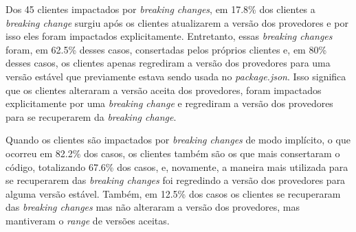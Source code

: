 Dos 45 clientes impactados por \textit{breaking changes}, em 17.8\% dos clientes a \textit{breaking change} surgiu após os clientes atualizarem a versão dos provedores e por isso eles foram impactados explicitamente. Entretanto, essas \textit{breaking changes} foram, em 62.5\% desses casos, consertadas pelos próprios clientes e, em 80\% desses casos, os clientes apenas regrediram a versão dos provedores para uma versão estável que previamente estava sendo usada no \textit{package.json}. Isso significa que os clientes alteraram a versão aceita dos provedores, foram impactados explicitamente por uma \textit{breaking change} e regrediram a versão dos provedores para se recuperarem da \textit{breaking change}.

Quando os clientes são impactados por \textit{breaking changes} de modo implícito, o que ocorreu em 82.2\% dos casos, os clientes também são os que mais consertaram o código, totalizando 67.6\% dos casos, e, novamente, a maneira mais utilizada para se recuperarem das \textit{breaking changes} foi regredindo a versão dos provedores para alguma versão estável. Também, em 12.5\% dos casos os clientes se recuperaram das \textit{breaking changes} mas não alteraram a versão dos provedores, mas mantiveram o \textit{range} de versões aceitas.


